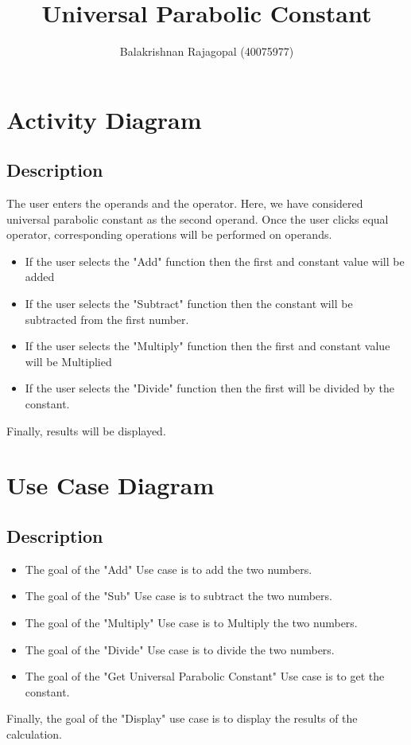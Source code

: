 \documentclass{report}
\title{Universal Parabolic Constant}
\author{Balakrishnan Rajagopal (40075977) }
\date{}
\begin{document}
\maketitle


\newpage\chapter{Activity Diagram}
\section{Description}
The user enters the operands and the operator. Here, we have considered universal parabolic constant as the second operand. Once the user clicks equal operator, corresponding operations will be performed on operands.

\begin{itemize}
    \item If the user selects the "Add" function then the first and constant value will be added
    \item If the user selects the "Subtract" function then the constant will be subtracted from the first number.
    \item If the user selects the "Multiply" function then the first and constant value will be Multiplied
    \item If the user selects the "Divide" function then the first will be divided by the constant.
\end{itemize}
Finally, results will be displayed.


\newpage
\newpage
\chapter{Use Case Diagram}


\section{Description}
\begin{itemize}
    \item The goal of the "Add" Use case is to add the two numbers. 
    \item The goal of the "Sub" Use case is to subtract the two numbers. 
    \item The goal of the "Multiply" Use case is to Multiply the two numbers. 
    \item The goal of the "Divide" Use case is to divide the two numbers.
    \item The goal of the "Get Universal Parabolic Constant" Use case is to get the constant.
\end{itemize}
Finally, the goal of the "Display" use case is to display the results of the calculation.



\end{document}
